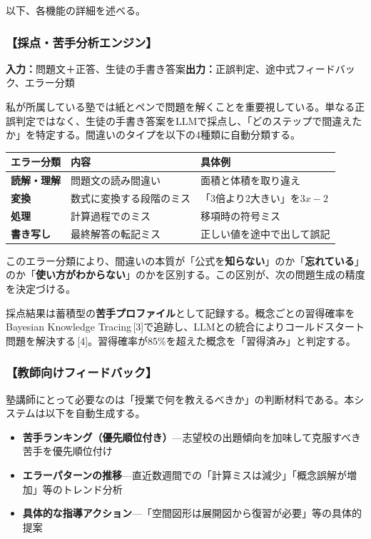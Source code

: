 \documentclass[paper=a4,fontsize=10.5bp,jafontsize=10.5bp,twocolumn]{jlreq}
\begin{document}
以下、各機能の詳細を述べる。

\subsubsection{【採点・苦手分析エンジン】}

\noindent\textbf{入力：}問題文＋正答、生徒の手書き答案\quad\textbf{出力：}正誤判定、途中式フィードバック、エラー分類

私が所属している塾では紙とペンで問題を解くことを重要視している。単なる正誤判定ではなく、生徒の手書き答案をLLMで採点し、「どのステップで間違えたか」を特定する。間違いのタイプを以下の4種類に自動分類する。

\begin{footnotesize}\noindent
\begin{tabularx}{\linewidth}{>{\bfseries}l X X}
\toprule
エラー分類 & 内容 & 具体例 \\
\midrule
読解・理解 & 問題文の読み間違い & 面積と体積を取り違え \\
変換 & 数式に変換する段階のミス & 「3倍より2大きい」を$3x-2$ \\
処理 & 計算過程でのミス & 移項時の符号ミス \\
書き写し & 最終解答の転記ミス & 正しい値を途中で出して誤記 \\
\bottomrule
\end{tabularx}
\end{footnotesize}

このエラー分類により、間違いの本質が「公式を\textbf{知らない}」のか「\textbf{忘れている}」のか「\textbf{使い方がわからない}」のかを区別する。この区別が、次の問題生成の精度を決定づける。

採点結果は蓄積型の\textbf{苦手プロファイル}として記録する。概念ごとの習得確率をBayesian Knowledge Tracing\,[3]で追跡し、LLMとの統合によりコールドスタート問題を解決する\,[4]。習得確率が85\%を超えた概念を「習得済み」と判定する。

\subsubsection{【教師向けフィードバック】}

塾講師にとって必要なのは「授業で何を教えるべきか」の判断材料である。本システムは以下を自動生成する。

\begin{itemize}
  \item \textbf{苦手ランキング（優先順位付き）}---志望校の出題傾向を加味して克服すべき苦手を優先順位付け
  \item \textbf{エラーパターンの推移}---直近数週間での「計算ミスは減少」「概念誤解が増加」等のトレンド分析
  \item \textbf{具体的な指導アクション}---「空間図形は展開図から復習が必要」等の具体的提案
\end{itemize}
\end{document}
